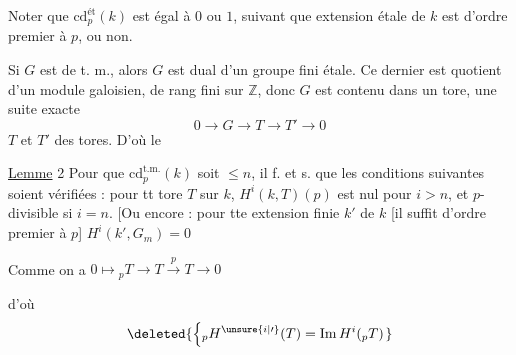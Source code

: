 Noter que $\mathrm{cd}_{p}^{\text{ét}}(k)$ est égal à $0$ ou $1$, suivant que  extension  étale de $k$ est d'ordre premier à $p$, ou non.

Si $G$ est de t. m., alors $G$ est dual d'un groupe fini étale. Ce dernier est quotient d'un module galoisien,  de rang fini sur $\mathbb{Z}$, donc $G$ est contenu dans un tore,  une suite exacte
\[
0\longrightarrow G\longrightarrow T\longrightarrow T'\longrightarrow 0
\]
$T$ et $T'$ des tores. D'où le

\uline{Lemme} 2 \quad Pour que $\mathrm{cd}_{p}^{\text{t.m.}}(k)$ soit $\leq n$, il f. et s. que les conditions suivantes soient vérifiées : pour tt tore $T$ sur $k$, $H^{i}(k,T)(p)$ est nul pour $i>n$, et $p$-divisible si $i=n$. [Ou encore : pour tte extension finie  $k'$ de $k$ [il suffit d'ordre premier à $p$]  $H^{i}(k',G_{m})=0$
\margin{si $i>n$, et $H^{n}(k',G_{m})$ est $p$-divisible]}

Comme on a $0\longmapsto {}_{p}T\longrightarrow T\xrightarrow{p}T\longrightarrow 0$

d'où
\[
\deleted{\left\{ {}_{p}H^{\unsure{i|\prime}}(T)=\operatorname{Im} H^{i}({}_{p}T)\right.}
\]


